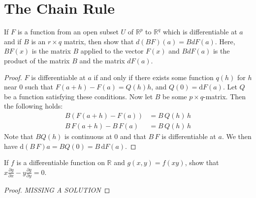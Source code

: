 \documentclass[12pt]{book}
\newcommand{\R}{\mathbb{R}}
\newenvironment{exercise}[2][Exercise]{\begin{trivlist}
\item[\hskip \labelsep {\bfseries #1}\hskip \labelsep {\bfseries #2.}]}{\end{trivlist}}
\begin{document}
\section{The Chain Rule}


\begin{exercise}{9.3.1}
	If $F$ is a function from an open subset $U$ of $\R^p$ to $\R^q$ which is differentiable at $a$ and if $B$ is an $r \times q$ matrix, then show that $d( BF) (a) = B d F(a)$. Here, $B F(x)$ is the matrix $B$ applied to the vector $F(x)$ and $BdF(a)$ is the product of the matrix $B$ and the matrix $dF(a)$.

	\begin{proof}
    $F$ is differentiable at $a$ if and only if there exists some function $q(h)$ for $h$ near $0$ such that $F(a+h)-F(a)=Q(h) h$, and $Q(0)=\text{d}F(a)$. Let $Q$ be a function satisfying these conditions. Now let $B$ be some $p\times q$-matrix. Then the following holds:
        \begin{align*}
        B \left(F(a+h)-F(a)\right) &= B\, Q(h)\, h  \\
          B \, F(a+h) - B \, F(a)  &= B\, Q(h)\, h
        \end{align*}
    Note that $B Q(h)$ is continuous at 0 and that $B \, F$ is differentiable at $a$. We then have $\text{d}(B\,F)a = B Q(0) = B\, \text{d} F(a)$.
	\end{proof}
\end{exercise}



\begin{exercise}{9.3.4}
	If $f$ is a differentiable function on $\R$ and $g(x, y) = f(x y)$, show  that $x \frac{\partial g}{\partial x} - y \frac{\partial g}{\partial y} = 0$.

	\begin{proof}
	\emph{MISSING A SOLUTION}
	\end{proof}
\end{exercise}
\end{document}
